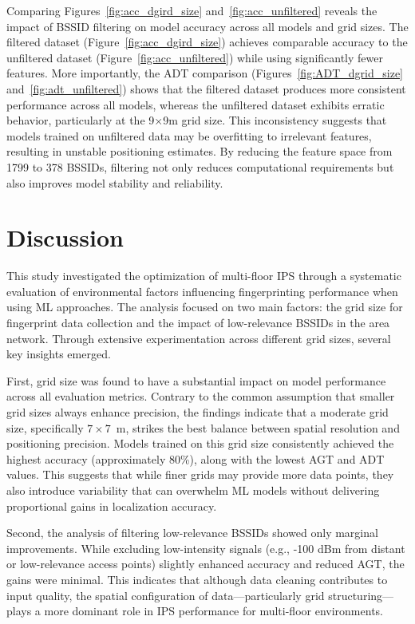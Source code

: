 \documentclass[runningheads]{llncs}
\begin{document}
Comparing Figures~\ref{fig:acc_dgird_size} and~\ref{fig:acc_unfiltered} reveals the impact of BSSID filtering on model accuracy across all models and grid sizes. The filtered dataset (Figure~\ref{fig:acc_dgird_size}) achieves comparable accuracy to the unfiltered dataset (Figure~\ref{fig:acc_unfiltered}) while using significantly fewer features. More importantly, the ADT comparison (Figures~\ref{fig:ADT_dgrid_size} and~\ref{fig:adt_unfiltered}) shows that the filtered dataset produces more consistent performance across all models, whereas the unfiltered dataset exhibits erratic behavior, particularly at the 9×9m grid size. This inconsistency suggests that models trained on unfiltered data may be overfitting to irrelevant features, resulting in unstable positioning estimates. By reducing the feature space from 1799 to 378 BSSIDs, filtering not only reduces computational requirements but also improves model stability and reliability.

\section{Discussion}\label{sec:discussion}

This study investigated the optimization of multi-floor IPS through a systematic evaluation of environmental factors influencing fingerprinting performance when using ML approaches. The analysis focused on two main factors: the grid size for fingerprint data collection and the impact of low-relevance BSSIDs in the area network. Through extensive experimentation across different grid sizes, several key insights emerged.

First, grid size was found to have a substantial impact on model performance across all evaluation metrics. Contrary to the common assumption that smaller grid sizes always enhance precision, the findings indicate that a moderate grid size, specifically $7\times7$~m, strikes the best balance between spatial resolution and positioning precision. Models trained on this grid size consistently achieved the highest accuracy (approximately 80\%), along with the lowest AGT and ADT values. This suggests that while finer grids may provide more data points, they also introduce variability that can overwhelm ML models without delivering proportional gains in localization accuracy.

Second, the analysis of filtering low-relevance BSSIDs showed only marginal improvements. While excluding low-intensity signals (e.g., -100 dBm from distant or low-relevance access points) slightly enhanced accuracy and reduced AGT, the gains were minimal. This indicates that although data cleaning contributes to input quality, the spatial configuration of data—particularly grid structuring—plays a more dominant role in IPS performance for multi-floor environments.
\end{document}
